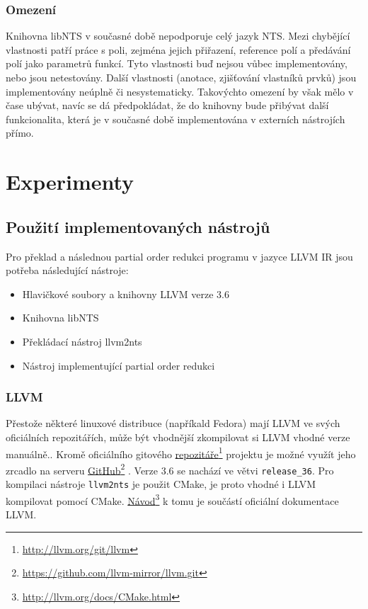 \documentclass[12pt]{fithesis2}
\newcommand\fnurl[2]{%
  \href{#2}{#1}\footnote{\url{#2}}%
}
\begin{document}
\subsection{Omezení}
Knihovna libNTS v současné době nepodporuje celý jazyk NTS. Mezi chybějící vlastnosti patří práce s poli, zejména jejich přiřazení, reference polí a předávání polí jako parametrů funkcí. Tyto vlastnosti buď nejsou vůbec implementovány, nebo jsou netestovány. Další vlastnosti (anotace, zjišťování vlastníků prvků) jsou implementovány neúplně či nesystematicky. Takovýchto omezení by však mělo v čase ubývat, navíc se dá předpokládat, že do knihovny bude přibývat další funkcionalita, která je v současné době implementována v externích nástrojích přímo.




\chapter{Experimenty}
\section{Použití implementovaných nástrojů}
Pro překlad a následnou partial order redukci programu v jazyce LLVM IR jsou potřeba následující nástroje:
\begin{itemize}
\item Hlavičkové soubory a knihovny LLVM verze 3.6
\item Knihovna libNTS
\item Překládací nástroj llvm2nts
\item Nástroj implementující partial order redukci
\end{itemize}

\subsection{LLVM}
Přestože některé linuxové distribuce (napříkald Fedora) mají LLVM ve svých oficiálních repozitářích, může být vhodnější zkompilovat si LLVM vhodné verze manuálně.. Kromě oficiálního gitového
\fnurl{repozitáře}{http://llvm.org/git/llvm} projektu je možné využít jeho zrcadlo na serveru
\fnurl{GitHub}{https://github.com/llvm-mirror/llvm.git}. Verze 3.6 se nachází ve větvi \texttt{release_36}. Pro kompilaci nástroje \texttt{llvm2nts} je použit CMake, je proto vhodné i LLVM kompilovat pomocí CMake. \fnurl{Návod}{http://llvm.org/docs/CMake.html} k tomu je součástí oficiální dokumentace LLVM.
\end{document}
